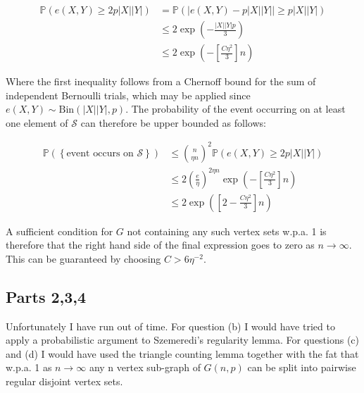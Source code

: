 \documentclass{article}
\begin{document}
\begin{align*}
    \mathbb{P}\left ( e(X,Y) \geq 2p \left | X \right | \left | Y \right |\right ) &= \mathbb{P}\left ( \left | e(X,Y) - p \left | X \right |\left | Y \right | \right | \geq  p \left | X \right |\left | Y \right | \right ) \\
    & \leq 2 \exp\left ( -\frac{\left | X \right | \left | Y \right | p }{3} \right ) \\ 
    & \leq 2 \exp\left ( -\left [ \frac{C\eta^2}{3} \right ]n \right )
\end{align*}

Where the first inequality follows from a Chernoff bound for the sum of independent Bernoulli trials, which may be applied since $e(X,Y) \sim \text{Bin}(\left | X \right | \left | Y \right |,p)$. The probability of the event occurring on at least one element of $\mathcal{S}$ can therefore be upper bounded as follows: 

\begin{align*}
    \mathbb{P}\left ( \left \{ \text{event occurs on }\mathcal{S} \right \} \right ) & \leq \binom{n}{\eta n}^2 \mathbb{P}\left ( e(X,Y) \geq 2p \left | X \right | \left | Y \right |\right ) \\ 
    & \leq 2 \left ( \frac{e}{\eta} \right )^{2 \eta n} \exp\left ( -\left [ \frac{C\eta^2}{3} \right ]n \right ) \\
    & \leq 2 \exp\left ( \left [ 2 - \frac{C \eta^2}{3} \right ] n  \right )
\end{align*}

A sufficient condition for $G$ not containing any such vertex sets w.p.a. 1 is therefore that the right hand side of the final expression goes to zero as $n \rightarrow \infty$. This can be guaranteed by choosing $C > 6\eta^{-2}$.

\subsection*{Parts 2,3,4}

Unfortunately I have run out of time. For question (b) I would have tried to apply a probabilistic argument to Szemeredi’s regularity lemma. For questions (c) and (d) I would have used the triangle counting lemma together with the fat that w.p.a. 1 as $n \rightarrow \infty$ any n vertex sub-graph of $G(n,p)$ can be split into pairwise regular disjoint vertex sets.

\newpage


\end{document}
